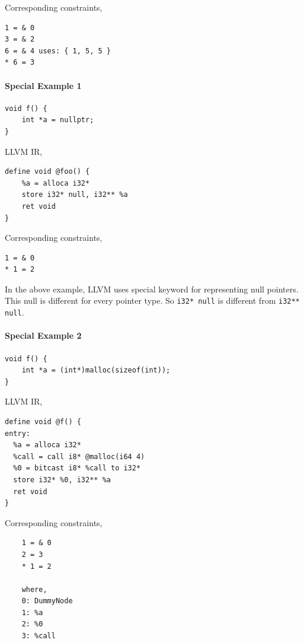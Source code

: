 \documentclass[a4paper,12pt]{report}
\begin{document}
Corresponding constraints,
\begin{lstlisting}
1 = & 0
3 = & 2
6 = & 4 uses: { 1, 5, 5 }
* 6 = 3
\end{lstlisting}

\paragraph{Special Example 1}

\begin{verbatim}
void f() {
    int *a = nullptr;
}
\end{verbatim}

\noindent
LLVM IR,

\begin{verbatim}
define void @foo() {
    %a = alloca i32*
    store i32* null, i32** %a
    ret void
}
\end{verbatim}

\noindent
Corresponding constraints,

\begin{lstlisting}
1 = & 0
* 1 = 2
\end{lstlisting}

In the above example, LLVM uses special keyword for representing null pointers.
This null is different for every pointer type. So \texttt{i32* null} is different
from \texttt{i32** null}.

\paragraph{Special Example 2}
\begin{verbatim}
void f() {
    int *a = (int*)malloc(sizeof(int));
}
\end{verbatim}

\noindent
LLVM IR,

\begin{verbatim}
define void @f() {
entry:
  %a = alloca i32*
  %call = call i8* @malloc(i64 4)
  %0 = bitcast i8* %call to i32*
  store i32* %0, i32** %a
  ret void
}

\end{verbatim}

\noindent
Corresponding constraints,

\begin{lstlisting}
    1 = & 0
    2 = 3
    * 1 = 2

    where,
    0: DummyNode
    1: %a
    2: %0
    3: %call
\end{lstlisting}
\end{document}
